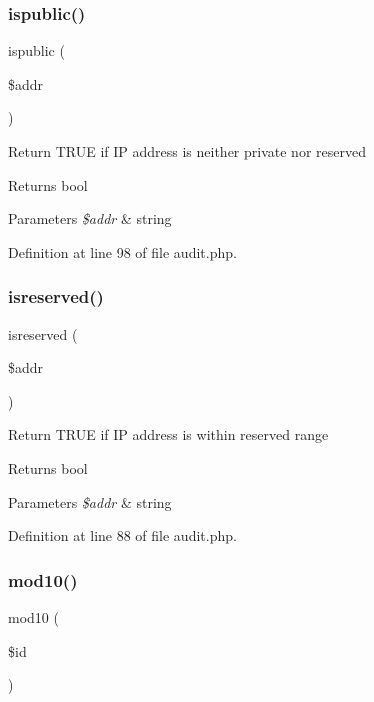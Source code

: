 \subsubsection{\texorpdfstring{ispublic()}{ispublic()}}
{\footnotesize\ttfamily ispublic (\begin{DoxyParamCaption}\item[{}]{\$addr }\end{DoxyParamCaption})}

Return T\+R\+UE if IP address is neither private nor reserved \begin{DoxyReturn}{Returns}
bool 
\end{DoxyReturn}

\begin{DoxyParams}{Parameters}
{\em \$addr} & string \\
\hline
\end{DoxyParams}


Definition at line 98 of file audit.\+php.

\hypertarget{class_audit_a352a97e07f1d2ebb7dcc009da6c67825}{}\label{class_audit_a352a97e07f1d2ebb7dcc009da6c67825} 
\subsubsection{\texorpdfstring{isreserved()}{isreserved()}}
{\footnotesize\ttfamily isreserved (\begin{DoxyParamCaption}\item[{}]{\$addr }\end{DoxyParamCaption})}

Return T\+R\+UE if IP address is within reserved range \begin{DoxyReturn}{Returns}
bool 
\end{DoxyReturn}

\begin{DoxyParams}{Parameters}
{\em \$addr} & string \\
\hline
\end{DoxyParams}


Definition at line 88 of file audit.\+php.

\hypertarget{class_audit_a80595e89a7b191abab586fcd73e54c6a}{}\label{class_audit_a80595e89a7b191abab586fcd73e54c6a} 
\subsubsection{\texorpdfstring{mod10()}{mod10()}}
{\footnotesize\ttfamily mod10 (\begin{DoxyParamCaption}\item[{}]{\$id }\end{DoxyParamCaption})}

